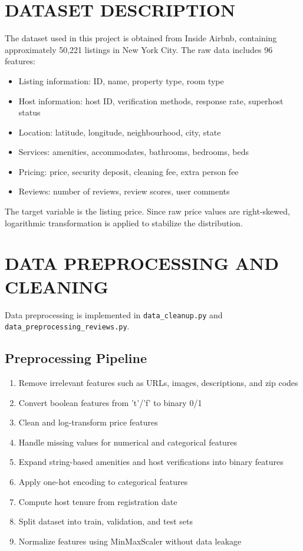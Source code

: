 \documentclass[11pt,a4paper]{article}
\begin{document}
\section{DATASET DESCRIPTION}
The dataset used in this project is obtained from Inside Airbnb, containing approximately 50,221 listings in New York City. The raw data includes 96 features:
\begin{itemize}
    \item Listing information: ID, name, property type, room type
    \item Host information: host ID, verification methods, response rate, superhost status
    \item Location: latitude, longitude, neighbourhood, city, state
    \item Services: amenities, accommodates, bathrooms, bedrooms, beds
    \item Pricing: price, security deposit, cleaning fee, extra person fee
    \item Reviews: number of reviews, review scores, user comments
\end{itemize}

The target variable is the listing price. Since raw price values are right-skewed, logarithmic transformation is applied to stabilize the distribution.

\section{DATA PREPROCESSING AND CLEANING}
Data preprocessing is implemented in \texttt{data\_cleanup.py} and \texttt{data\_preprocessing\_reviews.py}.

\subsection{Preprocessing Pipeline}
\begin{enumerate}
    \item Remove irrelevant features such as URLs, images, descriptions, and zip codes
    \item Convert boolean features from 't'/'f' to binary 0/1
    \item Clean and log-transform price features
    \item Handle missing values for numerical and categorical features
    \item Expand string-based amenities and host verifications into binary features
    \item Apply one-hot encoding to categorical features
    \item Compute host tenure from registration date
    \item Split dataset into train, validation, and test sets
    \item Normalize features using MinMaxScaler without data leakage
\end{enumerate}
\end{document}
